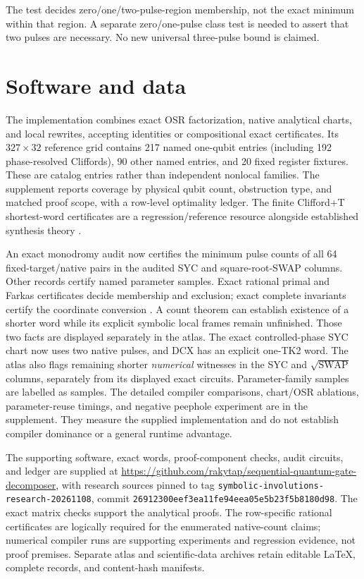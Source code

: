 \documentclass[a4paper,onecolumn,11pt,unpublished]{quantumarticle}
\begin{document}
The test decides zero/one/two-pulse-region membership, not the exact minimum
within that region. A separate zero/one-pulse class test is needed to assert
that two pulses are necessary. No new universal three-pulse bound is claimed.


\section{Software and data}\label{sec:data}
The implementation combines exact OSR factorization, native analytical charts,
and local rewrites, accepting identities or compositional exact certificates.
Its $327\times32$ reference grid contains 217 named one-qubit entries
(including 192 phase-resolved Cliffords), 90 other named entries, and 20
fixed register fixtures. These are catalog entries rather than independent
nonlocal families. The supplement reports coverage by physical qubit count,
obstruction type, and matched proof scope, with a row-level optimality ledger.
The finite Clifford+T shortest-word certificates are a regression/reference
resource alongside established synthesis theory \cite{matsumoto,kmm,giles,gilesma}.

An exact monodromy audit now certifies the minimum pulse counts of all
64 fixed-target/native pairs in the audited SYC and square-root-SWAP columns.
Other records certify named parameter samples. Exact rational primal and
Farkas certificates decide membership and exclusion; exact complete invariants
certify the coordinate conversion \cite{peterson,makhlin}. A count theorem
can establish existence of a shorter word while its explicit symbolic local
frames remain unfinished. Those two facts are displayed separately in the atlas.
The exact controlled-phase SYC chart now uses two native pulses, and DCX
has an explicit one-TK2 word. The atlas also flags remaining shorter
\emph{numerical} witnesses in the SYC and $\sqrt{\mathrm{SWAP}}$ columns,
separately from its displayed exact circuits. Parameter-family samples are
labelled as samples. The detailed compiler comparisons, chart/OSR ablations,
parameter-reuse timings, and negative peephole experiment are in the supplement.
They measure the supplied implementation and do not establish compiler
dominance or a general runtime advantage.

The supporting software, exact words, proof-component checks, audit circuits,
and ledger are supplied at
\url{https://github.com/rakytap/sequential-quantum-gate-decomposer}, with
research sources pinned to tag
\texttt{symbolic-involutions-research-20261108}, commit
\texttt{26912300eef3ea11fe94eea05e5b23f5b8180d98}.
The exact matrix checks support the analytical proofs. The row-specific
rational certificates are logically required for the enumerated native-count
claims; numerical compiler runs are supporting experiments and regression
evidence, not proof premises.
Separate atlas and scientific-data archives retain editable LaTeX, complete
records, and content-hash manifests.
\end{document}
